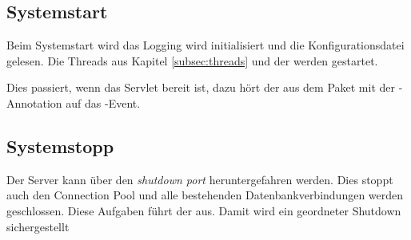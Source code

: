 \subsection{Systemstart}\label{subsec:systemstart}
Beim Systemstart wird das Logging wird initialisiert und die Konfigurationsdatei gelesen. Die Threads aus Kapitel \ref{subsec:threads} und der  werden gestartet.

Dies passiert, wenn das Servlet bereit ist, dazu hört der  aus dem Paket  mit der -Annotation auf das -Event.

\subsection{Systemstopp}\label{subsec:systemstopp}
Der Server kann über den \emph{shutdown port} heruntergefahren werden. Dies stoppt auch den Connection Pool und alle bestehenden Datenbankverbindungen werden geschlossen.
Diese Aufgaben führt der  aus.
Damit wird ein geordneter Shutdown sichergestellt
